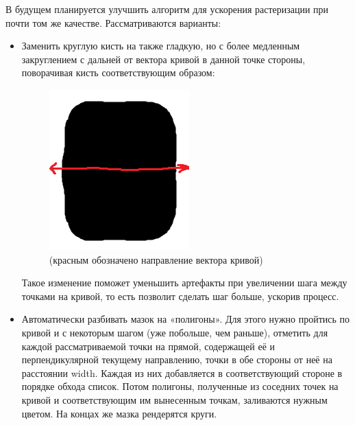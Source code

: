 \documentclass[11pt]{article}
\begin{document}
    В будущем планируется улучшить алгоритм для ускорения растеризации при почти том же качестве.
    Рассматриваются варианты:
    \begin{itemize}
        \item Заменить круглую кисть на также гладкую, но с более медленным закруглением с дальней от вектора кривой в данной точке стороны, поворачивая кисть соответствующим образом:
        \begin{figure}
            \centering
            \includegraphics{modern_brush.png}
            \caption{(красным обозначено направление вектора кривой)}
            \label{fig:modern_brush}
        \end{figure}
        Такое изменение поможет уменьшить артефакты при увеличении шага между точками на кривой, то есть позволит сделать шаг больше, ускорив процесс.

        \item Автоматически разбивать мазок на «полигоны».
                    Для этого нужно пройтись по кривой и с некоторым шагом (уже побольше, чем раньше),
                    отметить для каждой рассматриваемой точки на прямой, содержащей её и перпендикулярной текущему направлению, точки в обе стороны от неё на расстоянии width.
                    Каждая из них добавляется в соответствующий стороне в порядке обхода список.
                    Потом полигоны, полученные из соседних точек на кривой и соответствующим им вынесенным точкам, заливаются нужным цветом.
                    На концах же мазка рендерятся круги.


\end{itemize}
\end{document}
